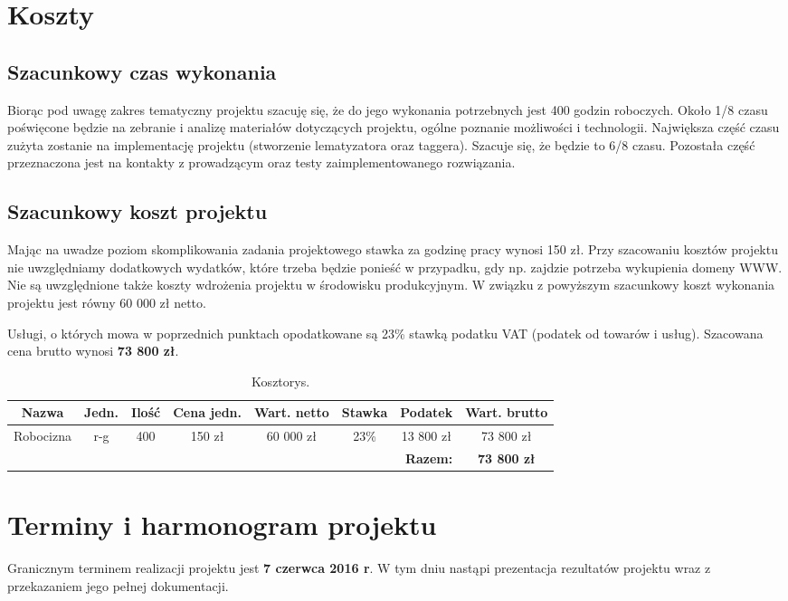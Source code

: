\section{Koszty}
\subsection*{Szacunkowy czas wykonania}
Biorąc pod uwagę zakres tematyczny projektu szacuję się, że do jego wykonania potrzebnych jest 400 godzin roboczych. Około 1/8 czasu poświęcone będzie na zebranie i analizę materiałów dotyczących projektu, ogólne poznanie możliwości i technologii. Największa część czasu zużyta zostanie na implementację projektu (stworzenie lematyzatora oraz taggera). Szacuje się, że będzie to 6/8 czasu. Pozostała część przeznaczona jest na kontakty z prowadzącym oraz testy zaimplementowanego rozwiązania.

\subsection*{Szacunkowy koszt projektu}
Mając na uwadze poziom skomplikowania zadania projektowego stawka za godzinę pracy wynosi 150 zł. Przy szacowaniu kosztów projektu nie uwzględniamy dodatkowych wydatków, które trzeba będzie ponieść w przypadku, gdy np. zajdzie potrzeba wykupienia domeny WWW. Nie są uwzględnione także koszty wdrożenia projektu w środowisku produkcyjnym. W związku z powyższym szacunkowy koszt wykonania projektu jest równy 60 000 zł netto.

Usługi, o których mowa w poprzednich punktach opodatkowane są 23\% stawką podatku VAT (podatek od towarów i usług). Szacowana cena brutto wynosi \textbf{73 800 zł}.

\begin{table}[H]
	\centering
	\caption{Kosztorys.}
	\smallskip
	\begin{tabular}{cccccccc}
		\toprule
		\textbf{Nazwa} & \textbf{Jedn.} & \textbf{Ilość} & \textbf{Cena jedn.} & \textbf{Wart. netto} & \textbf{Stawka} & \textbf{Podatek} & \textbf{Wart. brutto} \\
		\midrule
		Robocizna & r-g & 400 & 150 zł & 60 000 zł & 23\% & 13 800 zł & 73 800 zł \\
		\bottomrule
		\multicolumn{7}{r}{\bf Razem:} & \textbf{73 800 zł} \\
	\end{tabular}
\end{table}

\section{Terminy i harmonogram projektu}
Granicznym terminem realizacji projektu jest \textbf{7 czerwca 2016 r}. W tym dniu nastąpi prezentacja rezultatów projektu wraz z przekazaniem jego pełnej dokumentacji.

